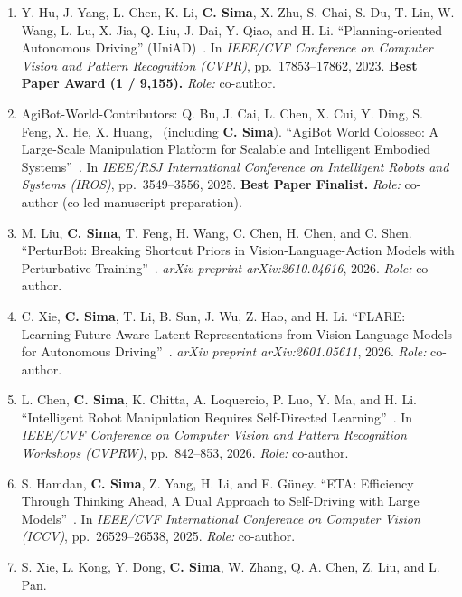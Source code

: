 \begin{enumerate}[label={\arabic*.}, leftmargin=2.4em, labelwidth=1.8em, labelsep=0.6em, align=left, itemsep=4pt, resume]
  \item Y. Hu, J. Yang, L. Chen, K. Li, \textbf{C. Sima}, X. Zhu, S. Chai, S. Du, T. Lin, W. Wang, L. Lu, X. Jia, Q. Liu, J. Dai, Y. Qiao, and H. Li.
        ``Planning-oriented Autonomous Driving'' (UniAD)~\cite{hu2023uniad}.
        In \emph{IEEE/CVF Conference on Computer Vision and Pattern Recognition (CVPR)}, pp.~17853--17862, 2023. \textbf{Best Paper Award (1 / 9,155).}
        \emph{Role:} co-author.
  \item AgiBot-World-Contributors: Q. Bu, J. Cai, L. Chen, X. Cui, Y. Ding, S. Feng, X. He, X. Huang, \etal\ (including \textbf{C. Sima}).
        ``AgiBot World Colosseo: A Large-Scale Manipulation Platform for Scalable and Intelligent Embodied Systems''~\cite{bu2025agibot_iros}.
        In \emph{IEEE/RSJ International Conference on Intelligent Robots and Systems (IROS)}, pp.~3549--3556, 2025. \textbf{Best Paper Finalist.}
        \emph{Role:} co-author (co-led manuscript preparation).
  \item M. Liu, \textbf{C. Sima}, T. Feng, H. Wang, C. Chen, H. Chen, and C. Shen.
        ``PerturBot: Breaking Shortcut Priors in Vision-Language-Action Models with Perturbative Training''~\cite{liu2026perturbot}.
        \emph{arXiv preprint arXiv:2610.04616}, 2026.
        \emph{Role:} co-author.
  \item C. Xie, \textbf{C. Sima}, T. Li, B. Sun, J. Wu, Z. Hao, and H. Li.
        ``FLARE: Learning Future-Aware Latent Representations from Vision-Language Models for Autonomous Driving''~\cite{xie2026flare}.
        \emph{arXiv preprint arXiv:2601.05611}, 2026.
        \emph{Role:} co-author.
  \item L. Chen, \textbf{C. Sima}, K. Chitta, A. Loquercio, P. Luo, Y. Ma, and H. Li.
        ``Intelligent Robot Manipulation Requires Self-Directed Learning''~\cite{chen2025robot}.
        In \emph{IEEE/CVF Conference on Computer Vision and Pattern Recognition Workshops (CVPRW)}, pp.~842--853, 2026.
        \emph{Role:} co-author.
  \item S. Hamdan, \textbf{C. Sima}, Z. Yang, H. Li, and F. G{\"u}ney.
        ``ETA: Efficiency Through Thinking Ahead, A Dual Approach to Self-Driving with Large Models''~\cite{hamdan2025eta}.
        In \emph{IEEE/CVF International Conference on Computer Vision (ICCV)}, pp.~26529--26538, 2025.
        \emph{Role:} co-author.
  \item S. Xie, L. Kong, Y. Dong, \textbf{C. Sima}, W. Zhang, Q. A. Chen, Z. Liu, and L. Pan.

\end{enumerate}
